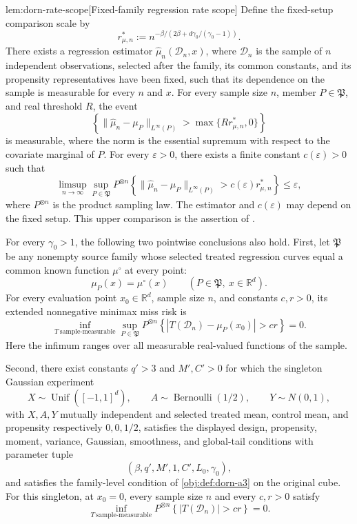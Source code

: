 \documentclass[11pt]{article}
\begin{document}
\begin{propositionv}{lem:dorn-rate-scope}[Fixed-family regression rate scope]
Define the fixed-setup comparison scale by
\[
r^*_{\mu,n}
:=n^{-\beta/(2\beta+d\gamma_0/(\gamma_0-1))}.
\]
There exists a regression estimator \(\widehat\mu_n(\mathcal D_n,x)\), where \(\mathcal D_n\) is the sample of \(n\) independent observations, selected after the family, its common constants, and its propensity representatives have been fixed, such that its dependence on the sample is measurable for every \(n\) and \(x\). For every sample size \(n\), member \(P\in\mathfrak P\), and real threshold \(R\), the event
\[
\left\{
\|\widehat\mu_n-\mu_P\|_{L^\infty(P)}
>\max\{Rr^*_{\mu,n},0\}
\right\}
\]
is measurable, where the norm is the essential supremum with respect to the covariate marginal of \(P\). For every \(\varepsilon>0\), there exists a finite constant \(c(\varepsilon)>0\) such that
\[
\limsup_{n\to\infty}\sup_{P\in\mathfrak P}
P^{\otimes n}\!\left\{
\|\widehat\mu_n-\mu_P\|_{L^\infty(P)}
>c(\varepsilon)r^*_{\mu,n}
\right\}
\le\varepsilon,
\]
where \(P^{\otimes n}\) is the product sampling law. The estimator and \(c(\varepsilon)\) may depend on the fixed setup. This upper comparison is the assertion of \citet[Section 2, Assumptions 1--3, Theorem 1(ii)]{Dorn2026GlobalOverlap}.

For every \(\gamma_0>1\), the following two pointwise conclusions also hold. First, let \(\mathfrak P\) be any nonempty source family whose selected treated regression curves equal a common known function \(\mu^\circ\) at every point:
\[
\mu_P(x)=\mu^\circ(x)
\qquad(P\in\mathfrak P,\ x\in\mathbb R^d).
\]
For every evaluation point \(x_0\in\mathbb R^d\), sample size \(n\), and constants \(c,r>0\), its extended nonnegative minimax miss risk is
\[
\inf_{T\ \mathrm{sample\text{-}measurable}}
\sup_{P\in\mathfrak P}
P^{\otimes n}\!\left\{
|T(\mathcal D_n)-\mu_P(x_0)|>cr
\right\}
=0.
\]
Here the infimum ranges over all measurable real-valued functions of the sample.

Second, there exist constants \(q'>3\) and \(M',C'>0\) for which the singleton Gaussian experiment
\[
X\sim\operatorname{Unif}([-1,1]^d),\qquad
A\sim\operatorname{Bernoulli}(1/2),\qquad
Y\sim N(0,1),
\]
with \(X,A,Y\) mutually independent and selected treated mean, control mean, and propensity respectively \(0,0,1/2\), satisfies the displayed design, propensity, moment, variance, Gaussian, smoothness, and global-tail conditions with parameter tuple
\[
(\beta,q',M',1,C',L_0,\gamma_0),
\]
and satisfies the family-level condition of \cref{obj:def:dorn-a3} on the original cube. For this singleton, at \(x_0=0\), every sample size \(n\) and every \(c,r>0\) satisfy
\[
\inf_{T\ \mathrm{sample\text{-}measurable}}
P^{\otimes n}\!\left\{|T(\mathcal D_n)|>cr\right\}
=0.
\]
\end{propositionv}
\end{document}

